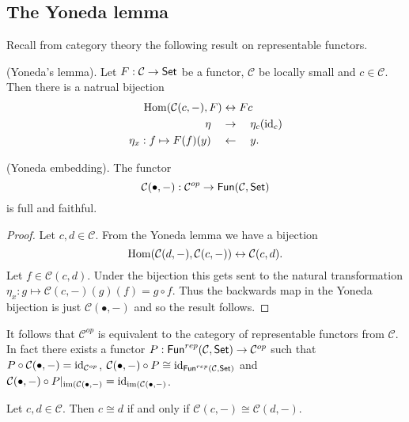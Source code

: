\documentclass{memoir}
\begin{document}
\subsection{The Yoneda lemma}
Recall from category theory the following result on representable functors.
\begin{thm}
    (Yoneda's lemma).
    Let $F:\mathcal C\to {\normalfont\mathsf{Set}}$ be a functor, $\mathcal C$ be locally small and $c\in \mathcal C$. Then there is a natrual bijection
    \begin{align}
        \operatorname{Hom}(\mathcal C(c,-),F) &\leftrightarrow Fc \\
        \eta \quad &\rightarrow \quad \eta_c(\operatorname{id}_c) \nonumber \\
        \eta_x: f\mapsto F(f)(y) \quad &\leftarrow \quad y. \nonumber 
    \end{align}
\end{thm}
\begin{corollary}
    (Yoneda embedding).
    The functor 
    \begin{equation}
        \mathcal C(\bullet,-):\mathcal C^{op}\to {\normalfont\mathsf{Fun}}(\mathcal C, {\normalfont\mathsf{Set}})
    \end{equation}
    is full and faithful.
\end{corollary}
\begin{proof}
    Let $c,d\in \mathcal C$.
    From the Yoneda lemma we have a bijection
    \begin{equation}
        \operatorname{Hom}(\mathcal C(d,-),\mathcal C(c,-)) \leftrightarrow \mathcal C(c,d).
    \end{equation}
    Let $f\in \mathcal C(c,d)$. 
    Under the bijection this gets sent to the natural transformation $\eta_x: g\mapsto \mathcal C(c,-)(g)(f) = g\circ f$.
    Thus the backwards map in the Yoneda bijection is just $\mathcal C(\bullet, -)$ and so the result follows.
\end{proof}
\begin{remark}
    It follows that $\mathcal C^{op}$ is equivalent to the category of representable functors from $\mathcal C$.
    In fact there exists a functor $P:{\normalfont\mathsf{Fun}}^{rep}(\mathcal C,{\normalfont\mathsf{Set}}) \to \mathcal C^{op}$ such that $P\circ \mathcal C(\bullet,-) = \operatorname{id}_{\mathcal C^{op}}$, $\mathcal C(\bullet,-)\circ P \cong \operatorname{id}_{{\normalfont\mathsf{Fun}}^{rep}(\mathcal C,{\normalfont\mathsf{Set}})}$ and $\mathcal C(\bullet,-)\circ P|_{\operatorname{im}(\mathcal C(\bullet,-)} = \operatorname{id}_{\operatorname{im}(\mathcal C(\bullet,-)}$.
\end{remark}
\begin{corollary}
    Let $c,d\in \mathcal C$. 
    Then $c\cong d$ if and only if $\mathcal C(c,-) \cong \mathcal C(d,-)$.
\end{corollary}
\end{document}
